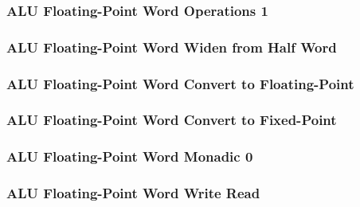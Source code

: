 \subsubsection[{\small ALU Floating-Point Word Operations 1}]{ALU Floating-Point Word Operations 1} \label{sec:format-ALU-FWMO1}



\subsubsection[{\small ALU Floating-Point Word Widen from Half Word}]{ALU Floating-Point Word Widen from Half Word} \label{sec:format-ALU-FWWIDEN}



\subsubsection[{\small ALU Floating-Point Word Convert to Floating-Point}]{ALU Floating-Point Word Convert to Floating-Point} \label{sec:format-ALU-FWFLOAT}



\subsubsection[{\small ALU Floating-Point Word Convert to Fixed-Point}]{ALU Floating-Point Word Convert to Fixed-Point} \label{sec:format-ALU-FWFIXED}



\subsubsection[{\small ALU Floating-Point Word Monadic 0}]{ALU Floating-Point Word Monadic 0} \label{sec:format-ALU-FWMO0}



\subsubsection[{\small ALU Floating-Point Word Write Read}]{ALU Floating-Point Word Write Read} \label{sec:format-ALU-FWWR}


